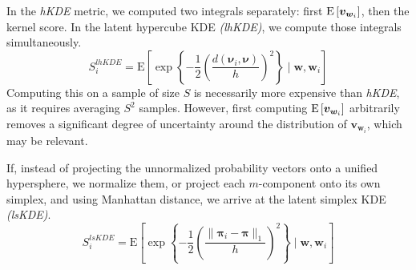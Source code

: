 In the \emph{hKDE} metric, we computed two integrals separately: first 
    $\text{E}\left[\bm{v}_{\bm{w}_i}\right]$, then the kernel score.  In the latent hypercube 
    KDE \emph{(lhKDE)}, we compute those integrals simultaneously.
  \begin{equation}
    \label{score:cat_lhkde}
    S_i^{lhKDE} = \text{E}\left[
    \exp\left\lbrace
    -\frac{1}{2}\left(
    \frac{d(\bm{\nu}_i, \bm{\nu})}{h}
    \right)^2
    \right\rbrace 
    \mid \bm{w}, \bm{w}_i
    \right]
  \end{equation}
Computing this on a sample of size $S$ is necessarily more expensive than \emph{hKDE}, 
    as it requires averaging $S^2$ samples.  However, first computing 
    $\text{E}\left[\bm{v}_{\bm{w}_i}\right]$ arbitrarily removes a significant degree of 
    uncertainty around the distribution of $\bm{v}_{\bm{w}_i}$, which may be relevant.

If, instead of projecting the unnormalized probability vectors onto a unified 
    hypersphere, we normalize them, or project each $m$-component onto its 
    own simplex, and using Manhattan distance, we arrive at the latent simplex KDE \emph{(lsKDE)}.
\begin{equation}
    \label{score:cat_lskde}
    S_i^{lsKDE} = \text{E}\left[\exp\left\lbrace
        -\frac{1}{2}\left(
        \frac{\lVert \bm{\pi}_i - \bm{\pi}\rVert_1}{h}
        \right)^2
        \right\rbrace
        \mid \bm{w},\bm{w}_i
        \right]
\end{equation}



